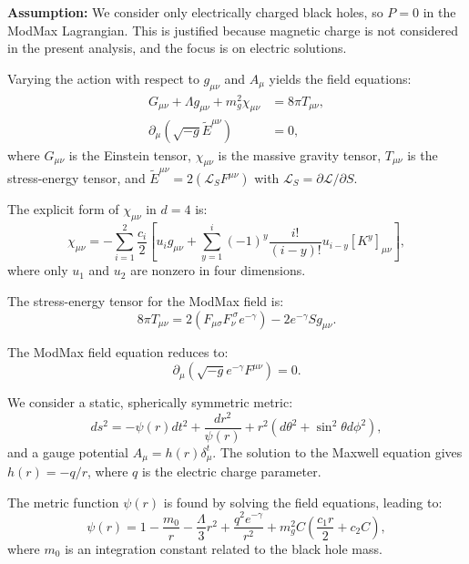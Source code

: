 \documentclass[superscriptaddress, prd, aps,amsmath,amssymb,showpacs,showkeys, onecolumn]{revtex4-2}
\begin{document}
\textbf{Assumption:} We consider only electrically charged black holes, so $P = 0$ in the ModMax Lagrangian. This is justified because magnetic charge is not considered in the present analysis, and the focus is on electric solutions.

Varying the action with respect to $g_{\mu\nu}$ and $A_\mu$ yields the field equations:
\begin{align}
G_{\mu\nu} + \Lambda g_{\mu\nu} + m_g^2 \chi_{\mu\nu} &= 8\pi T_{\mu\nu}, \\
\partial_\mu \left( \sqrt{-g} \tilde{E}^{\mu\nu} \right) &= 0,
\end{align}
where $G_{\mu\nu}$ is the Einstein tensor, $\chi_{\mu\nu}$ is the massive gravity tensor, $T_{\mu\nu}$ is the stress-energy tensor, and $\tilde{E}^{\mu\nu} = 2 (\mathcal{L}_S F^{\mu\nu})$ with $\mathcal{L}_S = \partial \mathcal{L}/\partial S$.

The explicit form of $\chi_{\mu\nu}$ in $d=4$ is:
\begin{equation}
\chi_{\mu\nu} = -\sum_{i=1}^{2} \frac{c_i}{2} \left[ u_i g_{\mu\nu} + \sum_{y=1}^i (-1)^y \frac{i!}{(i-y)!} u_{i-y} [K^y]_{\mu\nu} \right],
\end{equation}
where only $u_1$ and $u_2$ are nonzero in four dimensions.

The stress-energy tensor for the ModMax field is:
\begin{equation}
8\pi T_{\mu\nu} = 2 (F_{\mu\sigma} F_{\nu}^{\ \sigma} e^{-\gamma}) - 2 e^{-\gamma} S g_{\mu\nu}.
\end{equation}

The ModMax field equation reduces to:
\begin{equation}
\partial_\mu ( \sqrt{-g} e^{-\gamma} F^{\mu\nu} ) = 0.
\end{equation}

We consider a static, spherically symmetric metric:
\begin{equation}
ds^2 = -\psi(r) dt^2 + \frac{dr^2}{\psi(r)} + r^2 (d\theta^2 + \sin^2\theta d\phi^2),
\end{equation}
and a gauge potential $A_\mu = h(r) \delta^t_\mu$. The solution to the Maxwell equation gives $h(r) = -q/r$, where $q$ is the electric charge parameter.

The metric function $\psi(r)$ is found by solving the field equations, leading to:
\begin{equation}
\psi(r) = 1 - \frac{m_0}{r} - \frac{\Lambda}{3} r^2 + \frac{q^2 e^{-\gamma}}{r^2} + m_g^2 C \left( \frac{c_1 r}{2} + c_2 C \right),
\end{equation}
where $m_0$ is an integration constant related to the black hole mass.
\end{document}
